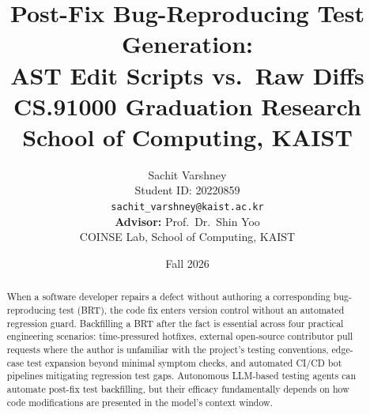 \documentclass[12pt, a4paper]{article}
\title{%
  \textbf{Post-Fix Bug-Reproducing Test Generation:\\
  AST Edit Scripts vs.\ Raw Diffs}\\[0.5em]
  \large CS.91000 Graduation Research\\
  School of Computing, KAIST
}
\author{%
  Sachit Varshney\\
  Student ID: 20220859\\
  \texttt{sachit\_varshney@kaist.ac.kr}\\[0.5em]
  \textbf{Advisor:} Prof.\ Dr.\ Shin Yoo\\
  COINSE Lab, School of Computing, KAIST
}
\date{Fall 2026}
\begin{document}
\maketitle

\begin{abstract}
When a software developer repairs a defect without authoring a corresponding bug-reproducing test (BRT), the code fix enters version control without an automated regression guard.
Backfilling a BRT after the fact is essential across four practical engineering scenarios: time-pressured hotfixes, external open-source contributor pull requests where the author is unfamiliar with the project's testing conventions, edge-case test expansion beyond minimal symptom checks, and automated CI/CD bot pipelines mitigating regression test gaps.
Autonomous LLM-based testing agents can automate post-fix test backfilling, but their efficacy fundamentally depends on how code modifications are presented in the model's context window.


\end{abstract}
\end{document}
